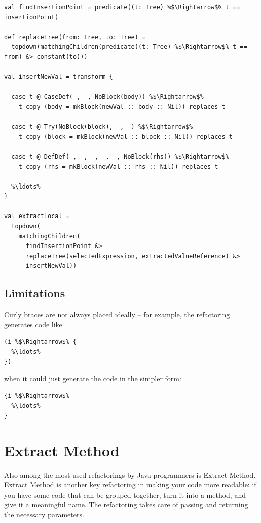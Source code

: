 \documentclass[10pt,a4paper,oneside]{scrreprt}
\begin{document}
\begin{lstlisting}
val findInsertionPoint = predicate((t: Tree) %$\Rightarrow$% t == insertionPoint)

def replaceTree(from: Tree, to: Tree) = 
  topdown(matchingChildren(predicate((t: Tree) %$\Rightarrow$% t == from) &> constant(to)))

val insertNewVal = transform {

  case t @ CaseDef(_, _, NoBlock(body)) %$\Rightarrow$%
    t copy (body = mkBlock(newVal :: body :: Nil)) replaces t
    
  case t @ Try(NoBlock(block), _, _) %$\Rightarrow$%
    t copy (block = mkBlock(newVal :: block :: Nil)) replaces t
    
  case t @ DefDef(_, _, _, _, _, NoBlock(rhs)) %$\Rightarrow$%
    t copy (rhs = mkBlock(newVal :: rhs :: Nil)) replaces t
    
  %\ldots%
}

val extractLocal = 
  topdown(
    matchingChildren(
      findInsertionPoint &> 
      replaceTree(selectedExpression, extractedValueReference) &>
      insertNewVal))
\end{lstlisting}

\subsection{Limitations}

Curly braces are not always placed ideally -- for example, the refactoring generates code like 

\begin{lstlisting}
(i %$\Rightarrow$% {
  %\ldots%
})
\end{lstlisting}

when it could just generate the code in the simpler form:

\begin{lstlisting}
{i %$\Rightarrow$%
  %\ldots%
}
\end{lstlisting}

\section{Extract Method}

Also among the most used refactorings by Java programmers is Extract Method. Extract Method is another key refactoring in making your code more readable: if you have some code that can be grouped together, turn it into a method, and give it a meaningful name. The refactoring takes care of passing and returning the necessary parameters.
\end{document}
